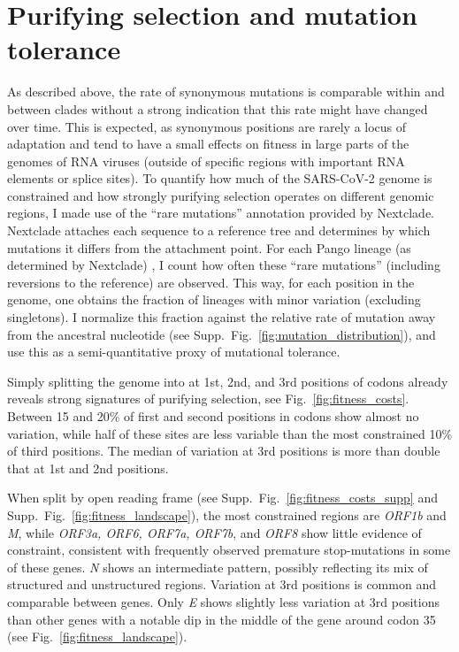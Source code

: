 \documentclass[aps,rmp, twocolumn]{revtex4}
\begin{document}
\section*{Purifying selection and mutation tolerance}

As described above, the rate of synonymous mutations is comparable within and between clades without a strong indication that this rate might have changed over time.
This is expected, as synonymous positions are rarely a locus of adaptation and tend to have a small effects on fitness in large parts of the genomes of RNA viruses \citep{zanini_vivo_2017} (outside of specific regions with important RNA elements or splice sites).
To quantify how much of the SARS-CoV-2 genome is constrained and how strongly purifying selection operates on different genomic regions, I made use of the ``rare mutations'' annotation provided by Nextclade.
Nextclade attaches each sequence to a reference tree and determines by which mutations it differs from the attachment point.
For each Pango lineage (as determined by Nextclade) \citep{rambaut_dynamic_2020,aksamentov_nextclade_2021}, I count how often these ``rare mutations'' (including reversions to the reference) are observed.
This way, for each position in the genome, one obtains the fraction of lineages with minor variation (excluding singletons).
I normalize this fraction against the relative rate of mutation away from the ancestral nucleotide (see Supp.~Fig.~\ref{fig:mutation_distribution}), and use this as a semi-quantitative proxy of mutational tolerance.

Simply splitting the genome into at 1st, 2nd, and 3rd positions of codons already reveals strong signatures of purifying selection, see Fig.~\ref{fig:fitness_costs}.
Between 15 and 20\% of first and second positions in codons show almost no variation, while half of these sites are less variable than the most constrained 10\% of third positions.
The median of variation at 3rd positions is more than double that at 1st and 2nd positions.

When split by open reading frame (see Supp.~Fig.~\ref{fig:fitness_costs_supp} and Supp.~Fig.~\ref{fig:fitness_landscape}), the most constrained regions are \emph{ORF1b} and \emph{M}, while \emph{ORF3a, ORF6, ORF7a, ORF7b}, and \emph{ORF8} show little evidence of constraint, consistent with frequently observed premature stop-mutations in some of these genes.
\emph{N} shows an intermediate pattern, possibly reflecting its mix of structured and unstructured regions.
Variation at 3rd positions is common and comparable between genes.
Only \emph{E} shows slightly less variation at 3rd positions than other genes with a notable dip in the middle of the gene around codon 35 (see Fig.~\ref{fig:fitness_landscape}).
\end{document}
